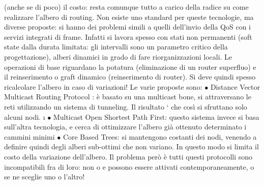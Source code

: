 (anche se di poco) il costo: resta comunque tutto a carico della radice su come realizzare l'albero di routing.
Non esiste uno standard per queste tecnologie, ma diverse proposte: si hanno dei problemi simili a quelli dell'invio
della QoS con i servizi integrati di frame.
Infatti si lavora spesso con stati non permanenti (soft state dalla durata limitata: gli intervalli sono un parametro
critico della progettazione), alberi dinamici in grado di fare riorganizzazioni locali. Le operazioni di base riguardano
la potatura (eliminazione di un router superfluo) e il reinserimento o graft dinamico (reinserimento di router). Si deve
quindi spesso ricalcolare l'albero in caso di
variazioni! Le varie proposte sono:
$\bullet$ Distance Vector Multicast Routing Protocol : è basato su una multicast
bone, si attraversano le reti utilizzando un sistema di tunneling. Il risultato
` che così si sfruttano solo alcuni nodi.
\i{}
$\bullet$ Multicast Open Shortest Path First: questo sistema invece si basa sull'altra tecnologia, e cerca di
ottimizzare l'albero già ottenuto determinato i
cammini minimi
$\bullet$ Core Based Trees: si mantengono costanti dei nodi, venendo a definire
quindi degli alberi sub-ottimi che non variano. In questo modo si limita il
costo della variazione dell'albero.
Il problema però è tutti questi protocolli sono incompatibili fra di loro: non
o e
possono essere attivati contemporaneamente, o se ne sceglie uno o l'altro!
